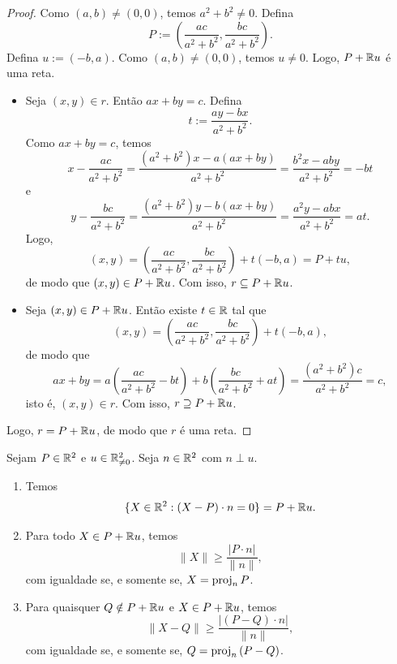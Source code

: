 \begin{proof}
    Como $(a,b) \neq (0,0)$, temos $a^2+b^2 \neq 0$. Defina
        \[
            P := \left(\frac{ac}{a^2+b^2},\frac{bc}{a^2+b^2}\right).
        \]
    Defina $u := (-b,a)$. Como $(a,b) \neq (0,0)$, temos $u \neq 0$. Logo, $P + \mathbb{R} u$ é uma reta. 
        \begin{itemize}[align=left]
            \item[($\subseteq$)] Seja $(x,y) \in r$. Então $ax+by=c$. Defina
                \[
                    t := \frac{ay-bx}{a^2+b^2}.
                \]
            Como $ax+by=c$, temos
                \[
                    x-\frac{ac}{a^2+b^2}
                    = \frac{(a^2+b^2)x-a(ax+by)}{a^2+b^2}
                    = \frac{b^2x-aby}{a^2+b^2}
                    = -bt
                \]
            e
                \[
                    y-\frac{bc}{a^2+b^2}
                    = \frac{(a^2+b^2)y-b(ax+by)}{a^2+b^2}
                    = \frac{a^2y-abx}{a^2+b^2}
                    = at.
                \]
            Logo,
                \[
                    (x,y)
                    = \left(\frac{ac}{a^2+b^2},\frac{bc}{a^2+b^2}\right) + t(-b,a)
                    = P+tu,
                \]
            de modo que $(x,y) \in P + \mathbb{R} u$. Com isso, $r \subseteq P + \mathbb{R} u$.
            \item[($\supseteq$)] Seja $(x,y) \in P + \mathbb{R} u$. Então existe $t \in \mathbb{R}$ tal que
                \[
                    (x,y)
                    = \left(\frac{ac}{a^2+b^2},\frac{bc}{a^2+b^2}\right)+t(-b,a),
                \]
            de modo que
                \[
                    ax+by
                    = a\left(\frac{ac}{a^2+b^2}-bt\right)+b\left(\frac{bc}{a^2+b^2}+at\right)
                    = \frac{(a^2+b^2)c}{a^2+b^2}
                    = c,
                \]
            isto é, $(x,y) \in r$. Com isso, $r \supseteq P + \mathbb{R} u$.
        \end{itemize}
    Logo, $r=P + \mathbb{R} u$, de modo que $r$ é uma reta. \blackproof
\end{proof}

\begin{theorem}
    Sejam $P \in \mathbb{R}^2$ e $u \in \mathbb{R}^2_{\neq 0}$. Seja $n \in \mathbb{R}^2$ com $n \perp u$.
        \begin{enumerate}[leftmargin=*, align=left, label=\textbf{(\alph*)}]
            \item Temos
                \[
                    \{ X \in \mathbb{R}^2 : (X-P) \cdot n = 0 \} = P + \mathbb{R} u.
                \]
            \item Para todo $X \in P + \mathbb{R} u$, temos
                \[
                    \| X \| \geq \dfrac{|P \cdot n|}{\| n\|},
                \]
            com igualdade se, e somente se, $X = \operatorname{proj}_{n}{P}$.
            \item Para quaisquer $Q \notin P + \mathbb{R} u$ e $X \in P + \mathbb{R} u$, temos
                \[
                    \| X-Q \| \geq \dfrac{|(P-Q)\cdot n|}{\|n\|},
                \]
            com igualdade se, e somente se, $Q = \operatorname{proj}_{n}{(P-Q)}$.
        \end{enumerate}
\end{theorem}
